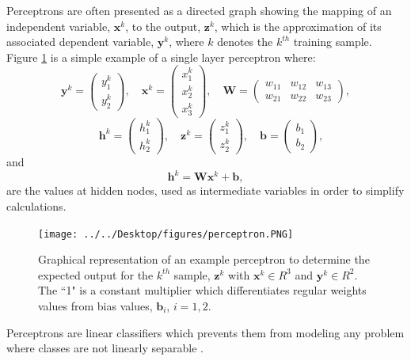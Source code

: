 \documentclass[letterpaper,12pt,titlepage,oneside,final]{book}
\begin{document}
	Perceptrons are often presented as a directed graph showing the mapping of an independent variable, $\mathbf{x}^{k}$, to the output, $\mathbf{z}^{k}$, which is the approximation of its associated dependent variable, $\mathbf{y}^{k}$, where $k$ denotes the $k^{th}$ training sample. Figure \ref{perceptron} is a simple example of a single layer perceptron where:
	\begin{equation}
	\mathbf{y}^{k} = 
	\begin{pmatrix}
	y_{1}^{k}\\ 
	y_{2}^{k}
	\end{pmatrix},
	\quad \mathbf{x}^{k} = 
	\begin{pmatrix}
	x_{1}^{k}\\ 
	x_{2}^{k}\\
	x_{3}^{k}
	\end{pmatrix},
	\quad \mathbf{W} = 
	\begin{pmatrix}
	w_{11} & w_{12} & w_{13} \\ 
	w_{21} & w_{22} & w_{23}
	\end{pmatrix},
	\end{equation}
	\begin{equation}
	\quad \mathbf{h}^{k} = 
	\begin{pmatrix}
	h_{1}^{k}\\ 
	h_{2}^{k}
	\end{pmatrix},
	\quad \mathbf{z}^{k} = 
	\begin{pmatrix}
	z_{1}^{k}\\ 
	z_{2}^{k}
	\end{pmatrix},
	\quad \mathbf{b} = 
	\begin{pmatrix}
	b_{1}\\ 
	b_{2}
	\end{pmatrix},
	\end{equation}
	and 
	\begin{equation}
	\mathbf{h}^{k} = \mathbf{W}\mathbf{x}^{k} + \mathbf{b},
	\end{equation}
	are the values at hidden nodes, used as intermediate variables in order to simplify calculations. 
	\begin{figure}[h]
		\centering
		\texttt{[image: ../../Desktop/figures/perceptron.PNG]}
		\caption{Graphical representation of an example perceptron to determine the expected output for the $k^{th}$ sample, $\mathbf{z}^{k}$ with $\mathbf{x}^{k} 
			\in R^{3}$ and $\mathbf{y}^{k} \in R^{2}$. The ``1" is a constant multiplier which differentiates regular weights values from bias values, $\mathbf{b}_{i}$, $i=1,2$.}
		\label{perceptron}
	\end{figure}
	Perceptrons are linear classifiers which prevents them from modeling any problem where classes are not linearly separable \cite{Shepherd.1997}.  
	
\end{document}
